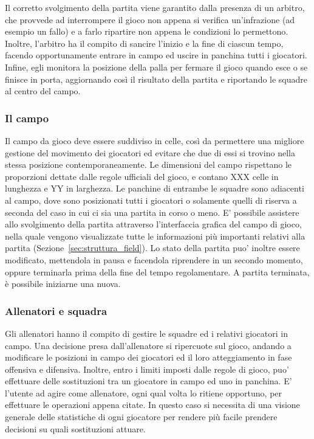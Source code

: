 Il corretto svolgimento della partita viene garantito dalla presenza di un arbitro, che provvede ad interrompere il gioco non appena si verifica un'infrazione (ad esempio un fallo) e a farlo ripartire non appena le condizioni lo permettono. Inoltre, l'arbitro ha il compito di sancire l'inizio e la fine di ciascun tempo, facendo opportunamente entrare in campo ed uscire in panchina tutti i giocatori. Infine, egli monitora la posizione della palla per fermare il gioco quando esce o se finisce in porta, aggiornando così il risultato della partita e riportando le squadre al centro del campo.\\

\subsubsection{Il campo}
\label{sec:analisi_campo}

Il campo da gioco deve essere suddiviso in celle, così da permettere una migliore gestione del movimento dei giocatori ed evitare che due di essi si trovino nella stessa posizione contemporaneamente. Le dimensioni del campo rispettano le proporzioni dettate dalle regole ufficiali del gioco, e contano XXX celle in lunghezza e YY in larghezza. Le panchine di entrambe le squadre sono adiacenti al campo, dove sono posizionati tutti i giocatori o solamente quelli di riserva a seconda del caso in cui ci sia una partita in corso o meno. E' possibile assistere allo svolgimento della partita attraverso l'interfaccia grafica del campo di gioco, nella quale vengono visualizzate tutte le informazioni più importanti relativi alla partita (Sezione~\ref{sec:struttura_field}). Lo stato della partita puo' inoltre essere modificato, mettendola in pausa e facendola riprendere in un secondo momento, oppure terminarla prima della fine del tempo regolamentare. A partita terminata, è possibile iniziarne una nuova.\\

\subsubsection{Allenatori e squadra}
\label{sec:analisi_allenatori}

Gli allenatori hanno il compito di gestire le squadre ed i relativi giocatori in campo. Una decisione presa dall'allenatore si ripercuote sul gioco, andando a modificare le posizioni in campo dei giocatori ed il loro atteggiamento in fase offensiva e difensiva. Inoltre, entro i limiti imposti dalle regole di gioco, puo' effettuare delle sostituzioni tra un giocatore in campo ed uno in panchina. E' l'utente ad agire come allenatore, ogni qual volta lo ritiene opportuno, per effettuare le operazioni appena citate. In questo caso si necessita di una visione generale delle statistiche di ogni giocatore per rendere più facile prendere decisioni su quali sostituzioni attuare.

